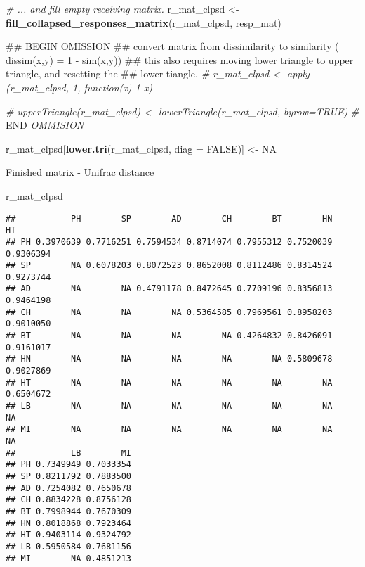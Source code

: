 \documentclass[]{article}
\newenvironment{Shaded}{\begin{snugshade}}{\end{snugshade}}
\newcommand{\KeywordTok}[1]{\textcolor[rgb]{0.13,0.29,0.53}{\textbf{#1}}}
\newcommand{\DataTypeTok}[1]{\textcolor[rgb]{0.13,0.29,0.53}{#1}}
\newcommand{\StringTok}[1]{\textcolor[rgb]{0.31,0.60,0.02}{#1}}
\newcommand{\CommentTok}[1]{\textcolor[rgb]{0.56,0.35,0.01}{\textit{#1}}}
\newcommand{\OtherTok}[1]{\textcolor[rgb]{0.56,0.35,0.01}{#1}}
\newcommand{\RegionMarkerTok}[1]{#1}
\newcommand{\NormalTok}[1]{#1}
\begin{document}
\begin{Shaded}
\begin{Highlighting}[]
\CommentTok{# ... and fill empty receiving matrix. }
\NormalTok{r_mat_clpsd <-}\StringTok{ }\KeywordTok{fill_collapsed_responses_matrix}\NormalTok{(r_mat_clpsd, resp_mat)}

\NormalTok{## }\RegionMarkerTok{BEGIN}\NormalTok{ OMISSION}
\NormalTok{## convert matrix from dissimilarity to similarity ( dissim(x,y) = 1 - sim(x,y))}
\NormalTok{##  this also requires moving lower triangle to upper triangle, and resetting the}
\NormalTok{##  lower tiangle. }
\CommentTok{# r_mat_clpsd <- apply (r_mat_clpsd, 1, function(x) 1-x)}

\CommentTok{# upperTriangle(r_mat_clpsd) <- lowerTriangle(r_mat_clpsd, byrow=TRUE)}
\CommentTok{# }\RegionMarkerTok{END}\CommentTok{ OMMISION }

\NormalTok{r_mat_clpsd[}\KeywordTok{lower.tri}\NormalTok{(r_mat_clpsd, }\DataTypeTok{diag =} \OtherTok{FALSE}\NormalTok{)] <-}\StringTok{ }\OtherTok{NA}
\end{Highlighting}
\end{Shaded}

Finished matrix - Unifrac distance

\begin{Shaded}
\begin{Highlighting}[]
\NormalTok{r_mat_clpsd}
\end{Highlighting}
\end{Shaded}

\begin{verbatim}
##           PH        SP        AD        CH        BT        HN        HT
## PH 0.3970639 0.7716251 0.7594534 0.8714074 0.7955312 0.7520039 0.9306394
## SP        NA 0.6078203 0.8072523 0.8652008 0.8112486 0.8314524 0.9273744
## AD        NA        NA 0.4791178 0.8472645 0.7709196 0.8356813 0.9464198
## CH        NA        NA        NA 0.5364585 0.7969561 0.8958203 0.9010050
## BT        NA        NA        NA        NA 0.4264832 0.8426091 0.9161017
## HN        NA        NA        NA        NA        NA 0.5809678 0.9027869
## HT        NA        NA        NA        NA        NA        NA 0.6504672
## LB        NA        NA        NA        NA        NA        NA        NA
## MI        NA        NA        NA        NA        NA        NA        NA
##           LB        MI
## PH 0.7349949 0.7033354
## SP 0.8211792 0.7883500
## AD 0.7254082 0.7650678
## CH 0.8834228 0.8756128
## BT 0.7998944 0.7670309
## HN 0.8018868 0.7923464
## HT 0.9403114 0.9324792
## LB 0.5950584 0.7681156
## MI        NA 0.4851213
\end{verbatim}
\end{document}
